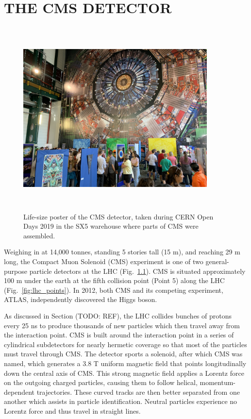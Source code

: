 \chapter{THE CMS DETECTOR} 
\label{ch:cms_detector}
\begin{figure}[pbth]
\centering
\includegraphics[width=10cm,height=10cm,keepaspectratio]{figures/cms/cms_poster_SX5.jpg}
    \caption{
    Life-size poster of the CMS detector, taken during CERN Open Days 2019
    in the SX5 warehouse where parts of CMS were assembled.}
    \label{fig:cms_poster}
\end{figure}
Weighing in at 14,000 tonnes, standing 5 stories tall (15 m), and reaching 29 m long, the Compact Muon Solenoid (CMS) experiment is one of two general-purpose particle detectors at the LHC (Fig.~\ref{fig:cms_poster}).
CMS is situated approximately 100 m under the earth at the fifth collision point (Point 5) along the LHC (Fig.~\ref{fig:lhc_points}).
In 2012, both CMS and its competing experiment, ATLAS, independently discovered the Higgs boson.

As discussed in Section (TODO: REF), the LHC collides bunches of protons every 25 ns to produce thousands of new particles which then travel away from the interaction point.
CMS is built around the interaction point in a series of cylindrical subdetectors for nearly hermetic coverage so that most of the particles must travel through CMS.
The detector sports a solenoid, after which CMS was named, which generates a 3.8 T uniform magnetic field that points longitudinally down the central axis of CMS.
This strong magnetic field applies a Lorentz force on the outgoing charged particles, causing them to follow helical, momentum-dependent trajectories.
These curved tracks are then better separated from one another which assists in particle identification.
Neutral particles experience no Lorentz force and thus travel in straight lines.

